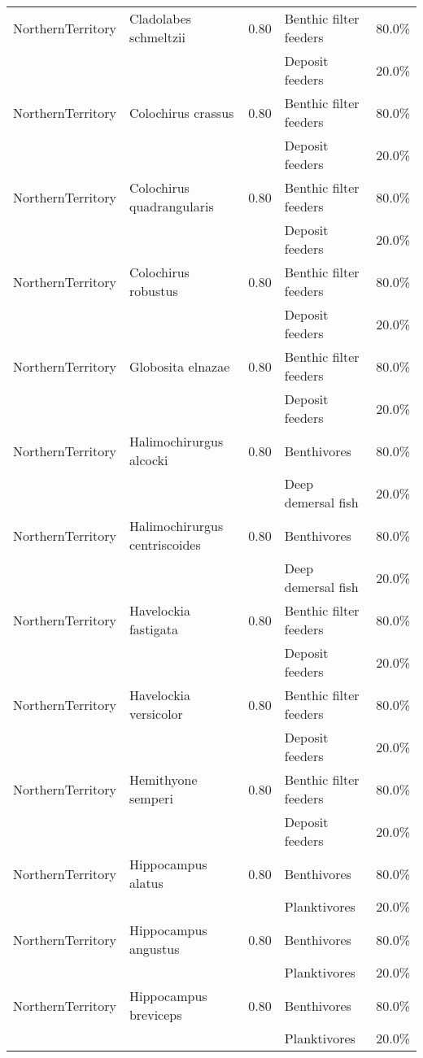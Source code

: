 \begin{longtable}{llcll}
\hline
NorthernTerritory & Cladolabes schmeltzii & 0.80 & Benthic filter feeders & 80.0\% \\
& & & Deposit feeders & 20.0\% \\
\hline
NorthernTerritory & Colochirus crassus & 0.80 & Benthic filter feeders & 80.0\% \\
& & & Deposit feeders & 20.0\% \\
\hline
NorthernTerritory & Colochirus quadrangularis & 0.80 & Benthic filter feeders & 80.0\% \\
& & & Deposit feeders & 20.0\% \\
\hline
NorthernTerritory & Colochirus robustus & 0.80 & Benthic filter feeders & 80.0\% \\
& & & Deposit feeders & 20.0\% \\
\hline
NorthernTerritory & Globosita elnazae & 0.80 & Benthic filter feeders & 80.0\% \\
& & & Deposit feeders & 20.0\% \\
\hline
NorthernTerritory & Halimochirurgus alcocki & 0.80 & Benthivores & 80.0\% \\
& & & Deep demersal fish & 20.0\% \\
\hline
NorthernTerritory & Halimochirurgus centriscoides & 0.80 & Benthivores & 80.0\% \\
& & & Deep demersal fish & 20.0\% \\
\hline
NorthernTerritory & Havelockia fastigata & 0.80 & Benthic filter feeders & 80.0\% \\
& & & Deposit feeders & 20.0\% \\
\hline
NorthernTerritory & Havelockia versicolor & 0.80 & Benthic filter feeders & 80.0\% \\
& & & Deposit feeders & 20.0\% \\
\hline
NorthernTerritory & Hemithyone semperi & 0.80 & Benthic filter feeders & 80.0\% \\
& & & Deposit feeders & 20.0\% \\
\hline
NorthernTerritory & Hippocampus alatus & 0.80 & Benthivores & 80.0\% \\
& & & Planktivores & 20.0\% \\
\hline
NorthernTerritory & Hippocampus angustus & 0.80 & Benthivores & 80.0\% \\
& & & Planktivores & 20.0\% \\
\hline
NorthernTerritory & Hippocampus breviceps & 0.80 & Benthivores & 80.0\% \\
& & & Planktivores & 20.0\% \\

\end{longtable}
